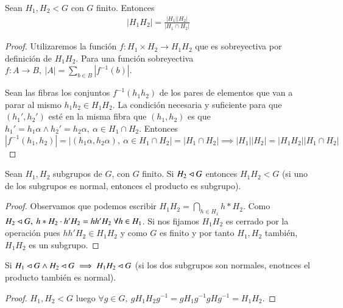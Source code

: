 \begin{thm}
	\label{thm:cardinalidadproductolibre}
	Sean $H_1, H_2 < G$ con $G$ finito. Entonces
	\begin{align}
	|H_1H_2| = \frac{|H_1||H_2|}{|H_1 \cap H_2|}
	\end{align}
\end{thm}

\begin{proof}
	Utilizaremos la función $f:H_1 \times H_2 \to H_1 H_2$ que es sobreyectiva por definición de $H_1 H_2$. Para una función sobreyectiva $f: A \to B,\ |A| = \sum_{b \in B} |f^{-1}(b)|$.
	
	
	Sean las fibras los conjuntos $f^{-1}(h_1h_2)$ de los pares de elementos que van a parar al mismo $h_1h_2 \in H_1 H_2$. La condición necesaria y suficiente para que $(h_1', h_2')$ esté en la misma fibra que $(h_1, h_2)$ es que $h_1' = h_1 \alpha \land h_2' = h_2 \alpha,\ \alpha \in H_1 \cap H_2$. Entonces $|f^{-1}(h_1, h_2)| = | (h_1 \alpha, h_2\alpha),\ \alpha \in H_1\cap H_2| = |H_1 \cap H_2| \implies |H_1||H_2| = |H_1 H_2| |H_1 \cap H_2|$ 
\end{proof}

\begin{thm}
	\label{thm:condicionproductolibre}
	Sean $H_1, H_2$ subgrupos de $G$, con $G$ finito. Si $H_2 \lhd G$ entonces $H_1 H_2 < G$ (si uno de los subgrupos es normal, entonces el producto es subgrupo).
\end{thm}

\begin{proof}
	Observamos que podemos escribir $H_1H_2 = \bigcap_{h \in H_1} h \ast H_2$. Como $H_2 \lhd G,\ h\ast H_2 \cdot h' H_2 = h h' H_2\ \forall h \in H_1$. Si nos fijamos $H_1 H_2$ es cerrado por la operación pues $h h' H_2 \in H_1H_2$ y como $G$ es finito y por tanto $H_1, H_2$ también, $H_1H_2$ es un subgrupo.	
\end{proof}

\begin{thm}
	Si $H_1 \lhd G \land H_2 \lhd G \implies H_1 H_2 \lhd G$ (si los dos subgrupos son normales, enotnces el producto también es normal).
\end{thm}

\begin{proof}
	$H_1,H_2 < G$ luego $\forall g \in G,\ gH_1H_2g^{-1} = gH_1g^{-1}gHg^{-1}  = H_1 H_2 $.
\end{proof}


